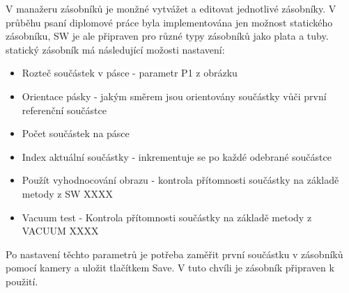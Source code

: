 V manažeru zásobníků je monžné vytvážet a editovat jednotlivé zásobníky. V průběhu psaní diplomové práce byla implementována jen možnost statického zásobníku\cite{fig:xxx}, SW je ale připraven pro různé typy zásobníků jako plata a tuby. statický zásobník má následující možosti nastavení:

\begin{itemize}
\item Rozteč součástek v pásce - parametr P1 z obrázku  \cite{fig:tape2}
\item Orientace pásky - jakým směrem jsou orientovány součástky vůči první referenční součástce
\item Počet součástek na pásce
\item Index aktuální součástky - inkrementuje se po každé odebrané součástce
\item Použít vyhodnocování obrazu - kontrola přítomnosti součástky na základě metody z SW XXXX
\item Vacuum test - Kontrola přítomnosti součástky na základě metody z VACUUM XXXX
\end{itemize}

Po nastavení těchto parametrů je potřeba zaměřit první součástku v zásobníků pomocí kamery a uložit tlačítkem Save. V tuto chvíli je zásobník připraven k použití.

